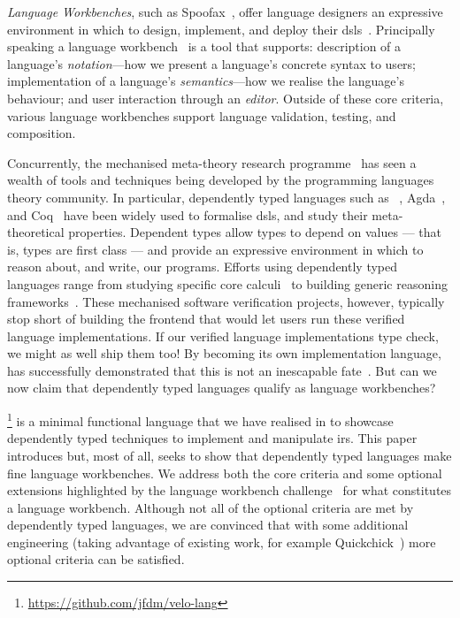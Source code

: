 \emph{Language Workbenches}, such as
Spoofax~\cite{DBLP:journals/software/WachsmuthKV14},
offer language designers an expressive environment in which to design,
implement, and deploy their \Acp{dsl}~\cite{hudak1996building}.
%
Principally speaking a language workbench~\cite{DBLP:conf/sle/ErdwegSVBBCGHKLKMPPSSSVVVWW13}
is a tool that supports:
description of a language's \emph{notation}---how we present a language's concrete syntax to users;
implementation of a language's \emph{semantics}---how we realise the language's behaviour;
and user interaction through an \emph{editor}.
%
Outside of these core criteria, various language workbenches
support language validation, testing, and composition.


Concurrently, the mechanised meta-theory research
programme~\cite{DBLP:conf/tphol/AydemirBFFPSVWWZ05,DBLP:journals/jfp/AbelAHPMSS19}
has seen a wealth of tools and techniques being developed
by the programming languages theory community.
%
In particular, dependently typed languages such as
\Idris{}~\cite{DBLP:conf/ecoop/Brady21},
Agda~\cite{DBLP:conf/afp/Norell08},
and Coq~\cite{the_coq_development_team_2022_5846982}
have been widely used to formalise \acp{dsl}, and study their
meta-theoretical properties.
%
Dependent types allow types to depend on values --- that is,
types are first class --- and provide an expressive environment
in which to reason about, and write, our programs.
%
Efforts using dependently typed languages range from
studying specific core calculi~\cite{10.1145/3093333.3009866,DBLP:conf/cpp/RouvoetPKV20,DBLP:conf/mpc/ChapmanKNW19}
to building generic reasoning frameworks~\cite{DBLP:conf/cpp/StarkSK19,DBLP:journals/jfp/AllaisACMM21}.
%
These mechanised software verification projects, however, typically stop short
of building the frontend that would let users run these verified
language implementations.
If our verified language implementations type check, we might as well ship them too!
%
By becoming its own implementation language, \Idris{} has successfully
demonstrated that this is not an inescapable fate~\cite{DBLP:conf/ecoop/Brady21}.
%
But can we now claim that dependently typed languages qualify as
language workbenches?

\Velo{}\footnote{\url{https://github.com/jfdm/velo-lang}} is a minimal functional language that we have realised in \Idris{}
to showcase dependently typed techniques to implement and manipulate \acp{ir}.
%
This paper introduces \Velo{} but, most of all, seeks to show that
dependently typed languages make fine language workbenches.
%
We address both the core criteria and some optional extensions
highlighted by the language workbench challenge~\cite{DBLP:conf/sle/ErdwegSVBBCGHKLKMPPSSSVVVWW13} for what constitutes a language workbench.
%
%
Although not all of the optional criteria
are met by dependently typed languages, we are convinced that
with some additional engineering (taking advantage of existing work,
for example Quickchick~\cite{DBLP:journals/pacmpl/LampropoulosPP18})
more optional criteria can be satisfied.

